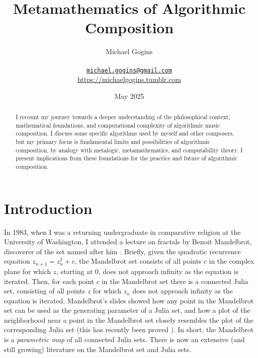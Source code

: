 \documentclass[11pt,papersize=a4]{scrartcl}
\begin{document}
\title{Metamathematics of Algorithmic Composition}
\author{Michael Gogins \\ \\ \texttt{\href{mailto:michael.gogins@gmail.com}{michael.gogins@gmail.com}}  \\ \url{https://michaelgogins.tumblr.com}}
\date{ May 2025}                                           %

\maketitle
\begin{abstract}
I recount my journey towards a deeper understanding of the philosophical context, mathematical foundations, and computational complexity of algorithmic music composition. I discuss some specific algorithms used by myself and other composers, but my primary focus is fundamental limits and possibilities of algorithmic composition, by analogy with metalogic, metamathematics, and computability theory. I present implications from these foundations for the practice and future of algorithmic composition. 
\end{abstract}

\section*{Introduction}

In 1983, when I was a returning undergraduate in comparative religion at the University of Washington, I attended a lecture on fractals by Benoit Mandelbrot, discoverer of the set named after him \parencite{citeulike:580392, peitgen2004mandelbrot}. Briefly, given the quadratic recurrence equation $z_{n+1} = z_n^2 + c$, the Mandelbrot set consists of all points $c$ in the complex plane for which $z$, starting at 0, does not approach infinity as the equation is iterated. Then, for each point $c$ in the Mandelbrot set there is a connected Julia set, consisting of all points $z$ for which $z_n$ does not approach infinity as the equation is iterated.  Mandelbrot's slides showed how any point in the Mandelbrot set can be used as the generating parameter of a Julia set, and how a plot of the neighborhood near a point in the Mandelbrot set closely resembles the plot of the corresponding Julia set \parencite{lei1990similarity} (this has recently been proved \parencite{kawahira2018julia}). In short, the Mandelbrot is a \emph{parametric map} of all connected Julia sets. There is now an extensive (and still growing) literature on the Mandelbrot set and Julia sets. 
\end{document}
